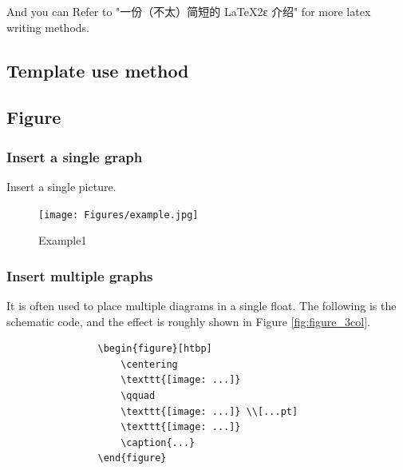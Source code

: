 \documentclass[twoside]{CUGCSthesis_EN}
\begin{document}
	And you can Refer to "一份（不太）简短的 \LaTeX 2ε 介绍" for more latex writing methods.


	
	
	\begin{spacing}{2}
		\section{Template use method}
	\end{spacing}
	
		\subsection{Figure}

			\subsubsection{Insert a single graph}

			Insert a single picture.

			\begin{figure}[H]
				\centering
				\texttt{[image: Figures/example.jpg]}
				\caption{Example1}
				\label{Fig:example}
			\end{figure}

			\subsubsection{Insert multiple graphs}

			It is often used to place multiple diagrams in a single float. The following is the schematic code, and the effect is roughly shown 
			in Figure \ref{fig:figure_3col}.

			\begin{verbatim}
				\begin{figure}[htbp]
					\centering
					\texttt{[image: ...]}
					\qquad
					\texttt{[image: ...]} \\[...pt]
					\texttt{[image: ...]}
					\caption{...}
				\end{figure}
			\end{verbatim}
\end{document}
